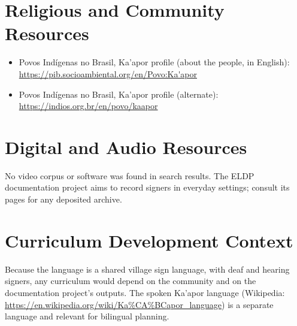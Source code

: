 \documentclass[12pt]{article}
\begin{document}
\section{Religious and Community Resources}
\begin{itemize}
\item Povos Ind\'igenas no Brasil, Ka'apor profile (about the people, in English): \url{https://pib.socioambiental.org/en/Povo:Ka'apor}
\item Povos Ind\'igenas no Brasil, Ka'apor profile (alternate): \url{https://indios.org.br/en/povo/kaapor}
\end{itemize}

\section{Digital and Audio Resources}
No video corpus or software was found in search results. The ELDP documentation project aims to record signers in everyday settings; consult its pages for any deposited archive.

\section{Curriculum Development Context}
Because the language is a shared village sign language, with deaf and hearing signers, any curriculum would depend on the community and on the documentation project's outputs. The spoken Ka'apor language (Wikipedia: \url{https://en.wikipedia.org/wiki/Ka%CA%BCapor_language}) is a separate language and relevant for bilingual planning.
\end{document}

